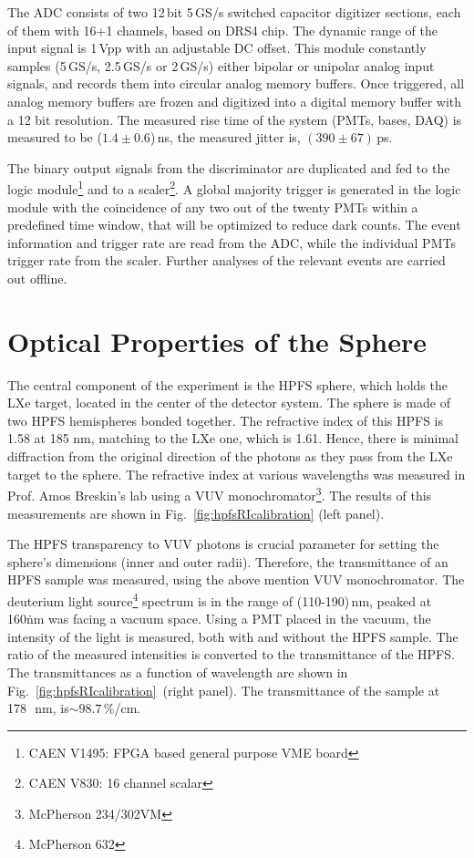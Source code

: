 The ADC consists of two 12\,bit 5\,GS/s switched capacitor digitizer sections, 
each of them with 16+1 channels, based on DRS4 chip. The dynamic range of the input signal is 1\,Vpp with an adjustable DC offset. This module constantly samples (5\,GS/s, 2.5\,GS/s or 2\,GS/s) either bipolar or unipolar analog input 
signals, and records them into circular 
analog memory buffers. Once triggered, all analog memory 
buffers are frozen and digitized into a digital memory buffer 
with a 12 bit resolution. The measured rise time of the system (PMTs, bases, DAQ) is measured to be ($1.4 \pm 0.6$)\,ns, the measured jitter is, $(390 \pm 67)$\,ps. 

The binary output signals from the discriminator are duplicated and fed to 
the logic module\footnote{CAEN V1495: FPGA based general purpose VME board} and to a scaler\footnote{CAEN V830: 16 channel scalar}. 
A global majority trigger is generated in the logic module with the coincidence of any two out of the twenty PMTs within a predefined time window, that will be optimized to reduce dark counts. The event information and trigger rate are read from the ADC, while the individual PMTs trigger rate from the scaler. Further analyses of the relevant events are carried out offline.



\section{Optical Properties of the Sphere }
\label{sec:opt}


The central component of the experiment is the HPFS sphere, which holds the LXe target, located in the center of the detector system. The sphere is made of two HPFS hemispheres bonded together. The refractive index of this HPFS is 1.58 at 185 nm, matching to the LXe one, which is 1.61. Hence, there is minimal diffraction from the original direction of the photons as they pass from the LXe target to the sphere. The refractive index at various wavelengths was measured in Prof. Amos Breskin's lab using a VUV monochromator\footnote{McPherson 234/302VM}. The results of this measurements are shown in Fig.~\ref{fig:hpfsRIcalibration} (left panel).


The HPFS transparency to VUV photons is crucial parameter for setting the sphere's dimensions (inner and outer radii). 
Therefore, the transmittance of an HPFS sample was measured, using the above mention VUV monochromator. The deuterium light source\footnote{McPherson 632} spectrum is in the range of (110-190)\,nm, peaked at 160\.nm was facing a vacuum space. Using a PMT placed in the vacuum, the intensity of the light is measured, both with and without the HPFS sample. The ratio of the measured intensities is converted to the transmittance of the HPFS. The transmittances as a function of wavelength are shown in Fig.~\ref{fig:hpfsRIcalibration}~(right panel). The transmittance of the sample at 178~\,nm, is$\sim98.7$\,\%/cm.  



